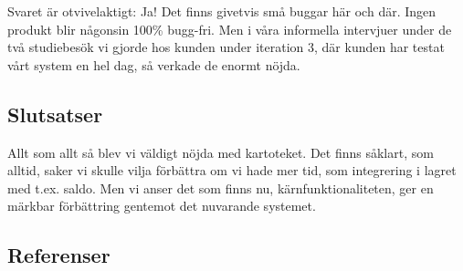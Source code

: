 Svaret är otvivelaktigt: Ja! Det finns
givetvis små buggar här och där. Ingen
produkt blir någonsin 100\% bugg-fri.
Men i våra informella intervjuer under de två studiebesök vi gjorde hos kunden
under iteration 3, där kunden har testat
vårt system en hel dag, så verkade de enormt nöjda.




\subsection{Slutsatser}
Allt som allt så blev vi väldigt nöjda med kartoteket.
Det finns såklart, som alltid, saker vi skulle vilja förbättra om vi
hade mer tid, som integrering i lagret med t.ex. saldo.
Men vi anser det som finns nu, kärnfunktionaliteten,
ger en märkbar förbättring gentemot det nuvarande systemet.




\subsection{Referenser}
\vspace{-9mm}
\renewcommand{\refname}{}
\begin{thebibliography}{9}

\end{thebibliography}
